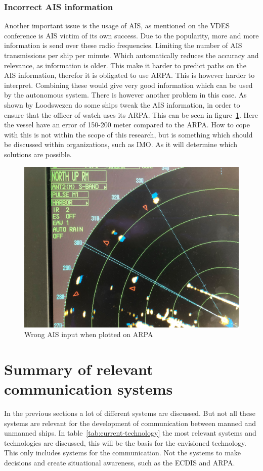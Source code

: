 \subsubsection{Incorrect AIS information}
Another important issue is the usage of AIS, as mentioned on the \acf{VDES} conference is AIS victim of its own success. Due to the popularity, more and more information is send over these radio frequencies. Limiting the number of AIS transmissions per ship per minute. Which automatically reduces the accuracy and relevance, as information is older. This make it harder to predict paths on the AIS information, therefor it is obligated to use \acf{ARPA}. This is however harder to interpret. Combining these would give very good information which can be used by the autonomous system.
There is however another problem in this case. As shown by Loodswezen do some ships tweak the AIS information, in order to ensure that the officer of watch uses its \ac{ARPA}. This can be seen in figure~\ref{fig:wrong-AIS}. Here the vessel have an error of 150-200 meter compared to the \ac{ARPA}. How to cope with this is not within the scope of this research, but is something which should be discussed within organizations, such as \acf{IMO}. As it will determine which solutions are possible.

\begin{figure}[bhp]
	\centering
	\includegraphics[width=.9\textwidth]{ais1.jpg}
	\caption{Wrong AIS input when plotted on ARPA}
	\label{fig:wrong-AIS}
\end{figure}

\section{Summary of relevant communication systems}
\label{sec:relevant-systems}
In the previous sections a lot of different systems are discussed. But not all these systems are relevant for the development of communication between manned and unmanned ships. In table~\ref{tab:current-technology} the most relevant systems and technologies are discussed, this will be the basis for the envisioned technology.
This only includes systems for the communication. Not the systems to make decisions and create situational awareness, such as the ECDIS and ARPA.

